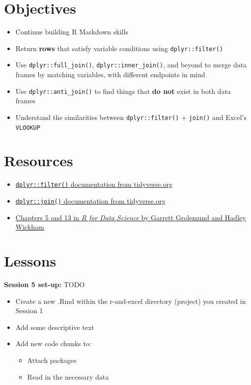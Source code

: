 \documentclass[]{book}
\providecommand{\tightlist}{%
  \setlength{\itemsep}{0pt}\setlength{\parskip}{0pt}}
\begin{document}
\hypertarget{objectives-1}{%
\section{Objectives}\label{objectives-1}}

\begin{itemize}
\tightlist
\item
  Continue building R Markdown skills
\item
  Return \textbf{rows} that satisfy variable conditions using \texttt{dplyr::filter()}
\item
  Use \texttt{dplyr::full\_join()}, \texttt{dplyr::inner\_join()}, and beyond to merge data frames by matching variables, with different endpoints in mind
\item
  Use \texttt{dplyr::anti\_join()} to find things that \textbf{do not} exist in both data frames
\item
  Understand the similarities between \texttt{dplyr::filter()} + \texttt{join()} and Excel's \texttt{VLOOKUP}
\end{itemize}

\hypertarget{resources-4}{%
\section{Resources}\label{resources-4}}

\begin{itemize}
\tightlist
\item
  \href{https://dplyr.tidyverse.org/reference/filter.html}{\texttt{dplyr::filter()} documentation from tidyverse.org}
\item
  \href{https://dplyr.tidyverse.org/reference/join.html}{\texttt{dplyr::join()} documentation from tidyverse.org}
\item
  \href{https://r4ds.had.co.nz/}{Chapters 5 and 13 in \emph{R for Data Science} by Garrett Grolemund and Hadley Wickham}
\end{itemize}

\hypertarget{lessons}{%
\section{Lessons}\label{lessons}}

\textbf{Session 5 set-up:} TODO

\begin{itemize}
\tightlist
\item
  Create a new .Rmd within the r-and-excel directory (project) you created in Session 1
\item
  Add some descriptive text
\item
  Add new code chunks to:

  \begin{itemize}
  \tightlist
  \item
    Attach packages
  \item
    Read in the necessary data
  \end{itemize}
\end{itemize}
\end{document}
